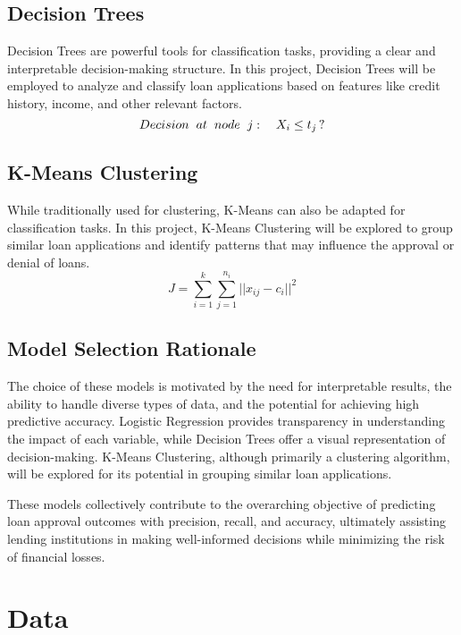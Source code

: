 \documentclass[10pt]{article}
\begin{document}
\subsection*{Decision Trees}

Decision Trees are powerful tools for classification tasks, providing a clear and interpretable decision-making structure. In this project, Decision Trees will be employed to analyze and classify loan applications based on features like credit history, income, and other relevant factors.
\[
Decision \hspace{0.2cm} at \hspace{0.2cm} node \hspace{0.2cm} j: \quad X_i \leq t_j \, ?\]


\subsection*{K-Means Clustering}

While traditionally used for clustering, K-Means can also be adapted for classification tasks. In this project, K-Means Clustering will be explored to group similar loan applications and identify patterns that may influence the approval or denial of loans.
\[
J = \sum_{i=1}^{k} \sum_{j=1}^{n_i} ||x_{ij} - c_i||^2
\]


\subsection*{Model Selection Rationale}

The choice of these models is motivated by the need for interpretable results, the ability to handle diverse types of data, and the potential for achieving high predictive accuracy. Logistic Regression provides transparency in understanding the impact of each variable, while Decision Trees offer a visual representation of decision-making. K-Means Clustering, although primarily a clustering algorithm, will be explored for its potential in grouping similar loan applications.

These models collectively contribute to the overarching objective of predicting loan approval outcomes with precision, recall, and accuracy, ultimately assisting lending institutions in making well-informed decisions while minimizing the risk of financial losses.

\section*{Data}
\end{document}
